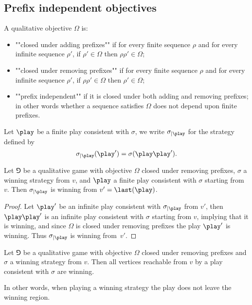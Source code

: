 \subsection*{Prefix independent objectives}
A qualitative objective $\Omega$ is:
\begin{itemize}
	\item ""closed under adding prefixes"" if for every finite sequence $\rho$ and for every infinite sequence $\rho'$,
if $\rho' \in \Omega$ then $\rho \rho' \in \Omega$;
	\item ""closed under removing prefixes"" if for every finite sequence $\rho$ and for every infinite sequence $\rho'$,
if $\rho \rho' \in \Omega$ then $\rho' \in \Omega$;
	\item ""prefix independent"" if it is closed under both adding and removing prefixes;
in other words whether a sequence satisfies $\Omega$ does not depend upon finite prefixes.
\end{itemize}

Let $\play$ be a finite play consistent with $\sigma$, we write $\sigma_{\mid \play}$ for the strategy defined by
\[
\sigma_{\mid \play}(\play') = \sigma(\play \play').
\]

\begin{fact}
\label{1-fact:winning_prefix_independent_qualitative}
Let $\Game$ be a qualitative game with objective $\Omega$ closed under removing prefixes,
$\sigma$ a winning strategy from $v$,
and $\play$ a finite play consistent with $\sigma$ starting from $v$.
Then $\sigma_{\mid \play}$ is winning from $v' = \last(\play)$.
\end{fact}
\begin{proof}
Let $\play'$ be an infinite play consistent with $\sigma_{\mid \play}$ from $v'$,
then $\play \play'$ is an infinite play consistent with $\sigma$ starting from $v$, 
implying that it is winning, and since $\Omega$ is closed under removing prefixes
the play $\play'$ is winning. Thus $\sigma_{\mid \play}$ is winning from~$v'$.
\end{proof}

\begin{corollary}
\label{1-cor:reachable_vertices_prefix_independent}
Let $\Game$ be a qualitative game with objective $\Omega$ closed under removing prefixes and $\sigma$ a winning strategy from $v$.
Then all vertices reachable from $v$ by a play consistent with $\sigma$ are winning.
\end{corollary}
In other words, when playing a winning strategy the play does not leave the winning region.


